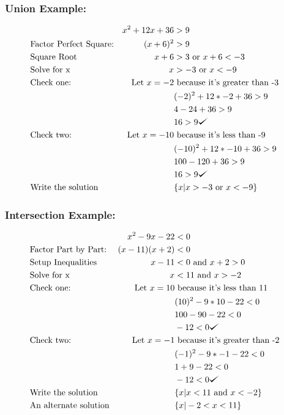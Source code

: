 \documentclass{book}
\theoremstyle{definition}
\def\checkmark{\tikz\fill[scale=0.4](0,.35) -- (.25,0) -- (1,.7) -- (.25,.15) -- cycle;}
\begin{document}
\subsubsection{Union Example:}

\begin{align*}\label{(6.13)}
&       &x^2+12x+36 &> 9& \\
&\text{Factor Perfect Square:}  &(x+6)^2 &>9& \\
&\text{Square Root}             &x+6&>3 \text{ or } x+6<-3\\
&\text{Solve for x}             &x&>-3 \text{ or } x<-9\\
&\text{Check one:}  &\text{Let }x=-2&\text{ because it's greater than -3} \\
&       &&(-2)^2+12*-2+36 > 9\\
&       &&4-24+36 > 9	\\
&       && 16 > 9 \checkmark{} \\
&\text{Check two:}  &\text{Let }x=-10&\text{ because it's less than -9} \\
&       &&(-10)^2+12*-10+36 > 9\\
&       &&100-120+36 > 9	\\
&       && 16 > 9 \checkmark{} \\
&\text{Write the solution}   &&\{x|x>-3\text{ or }x<-9\}
\end{align*}

\subsubsection{Intersection Example:}

\begin{align*}\label{(6.14)}
&                             &x^2-9x-22   &< 0& \\
&\text{Factor Part by Part:}  &(x-11)(x+2) &< 0& \\
&\text{Setup Inequalities}    & x-11       &< 0 \text{ and } x+2 > 0&\\
&\text{Solve for x}           & x          &<11 \text{ and } x>-2   &\\
&\text{Check one:}            &\text{Let }x=10&\text{ because it's less than 11}& \\
&       &&(10)^2-9*10-22 < 0\\
&       &&100-90-22<0	\\
&       && -12 < 0 \checkmark{} \\
&\text{Check two:}  &\text{Let }x=-1&\text{ because it's greater than -2} \\
&       &&(-1)^2-9*-1-22 < 0\\
&       &&1+9-22 < 0	\\
&       && -12 < 0 \checkmark{} \\
&\text{Write the solution}   &&\{x|x<11\text{ and }x<-2\} \\
&\text{An alternate solution} &&\{x|-2<x<11\}
\end{align*}
\end{document}
